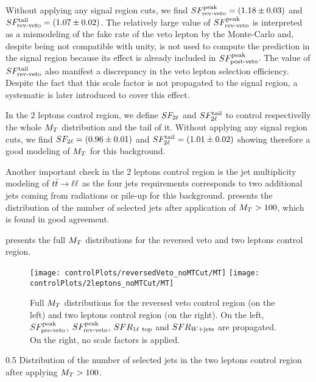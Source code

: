         Without applying any signal region cuts, we find $SF_{\text{rev-veto}}^{\text{peak}} = (1.18 \pm 0.03)$ and
        $SF_{\text{rev-veto}}^{\text{tail}} = (1.07 \pm 0.02)$. The relatively large value of $SF_{\text{rev-veto}}^{\text{peak}}$ is
        interpreted as a mismodeling of the fake rate of the veto lepton by the Monte-Carlo
        and, despite being not compatible with unity, is not used to compute the prediction
        in the signal region because its effect is already included in $SF_{\text{post-veto}}^{\text{peak}}$. The
        value of $SF_{\text{rev-veto}}^{\text{tail}}$ also manifest a discrepancy in the veto lepton selection
        efficiency. Despite the fact that this scale factor is not propagated to the
        signal region, a systematic is later introduced to cover this effect.

        In the 2 leptons control region, we define $SF_{2\ell}$ and $SF_{2\ell}^{\text{tail}}$ to
        control respectivelly the whole $M_T$ distribution and the tail of it.
        Without applying any signal region cuts, we find $SF_{2\ell} = (0.96 \pm 0.01)$
        and $SF_{2\ell}^{\text{tail}} = (1.01 \pm 0.02)$ showing therefore a good modeling of $M_T$
        for this background.

        Another important check in the 2 leptons control region is the jet multiplicity
        modeling of $t\bar{t} \rightarrow \ell \ell$ as the four jets requirements corresponds to two
        additional jets coming from radiations or pile-up for this background.
         presents the distribution of the number of selected jets after
        application of $M_T>100$, which is found in good agreement.

         presents the full $M_T$
        distributions for the reversed veto and two leptons control region.

        \begin{figure}[h!]
            \centering
            \texttt{[image: controlPlots/reversedVeto\_noMTCut/MT]}
            \texttt{[image: controlPlots/2leptons\_noMTCut/MT]}
            \caption{Full $M_T$ distributions for the reversed veto control region (on the left) and two leptons control region (on the right). On the left, $SF_{\text{pre-veto}}^{\text{peak}}$, $SF_{\text{rev-veto}}^{\text{peak}}$, $SFR_{1\ell~\text{top}}$ and $SFR_{\text{$W$+jets}}$ are propagated. On the right, no scale factors is applied.}
                    \label{fig:preselMT2leptonAndLepPlusVeto}
        \end{figure}

                     {0.5}
                     {Distribution of the number of selected jets in the two leptons control region after applying $M_T > 100$.}

